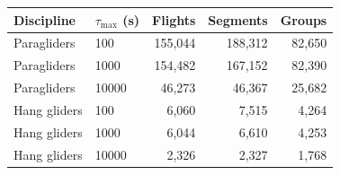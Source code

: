 \begin{tabular}{llrrr}
\toprule
Discipline & $\tau_{\max}$ (s) & Flights & Segments & Groups\\
\midrule
Paragliders & 100 & 155,044 & 188,312 & 82,650\\
Paragliders & 1000 & 154,482 & 167,152 & 82,390\\
Paragliders & 10000 & 46,273 & 46,367 & 25,682\\
Hang gliders & 100 & 6,060 & 7,515 & 4,264\\
Hang gliders & 1000 & 6,044 & 6,610 & 4,253\\
Hang gliders & 10000 & 2,326 & 2,327 & 1,768\\
\bottomrule
\end{tabular}
